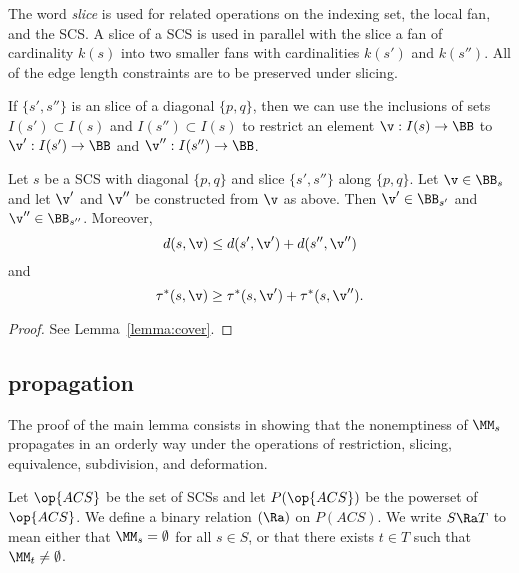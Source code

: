 The word {\it slice} is used for related operations on the indexing
set, the local fan, and the SCS.  A slice of a
SCS is used in parallel with the slice a fan of
cardinality $k(s)$ into two smaller fans with cardinalities $k(s')$ and
$k(s'')$.  
All of the edge length constraints are to be preserved
under slicing.  

If $\{s',s''\}$ is an slice of a diagonal $\{p,q\}$, then we can use
the inclusions of sets $I(s')\subset I(s)$ and $I(s'')\subset I(s)$ to
restrict an element $\v:I(s)\to\BB$ to $\v':I(s')\to \BB$ and
$\v'':I(s'')\to \BB$.  

\begin{lemma}\label{lemma:cover2}
Let $s$ be a SCS with diagonal $\{p,q\}$ and slice
 $\{s',s''\}$ along $\{p,q\}$.
Let $\v\in \BB_s$ and let $\v'$ and $\v''$ be constructed from $\v$ as above.
Then  $\v'\in \BB_{s'}$ and $\v''\in \BB_{s''}$.
Moreover,
\begin{equation}
d(s,\v) \le d(s',\v') + d(s'',\v'')
\end{equation}
and
\begin{equation}
\tau^*(s,\v)\ge \tau^*(s,\v')+\tau^*(s,\v'').
\end{equation}
\end{lemma}

\begin{proof} See Lemma~\ref{lemma:cover}.
\end{proof}

\subsection{propagation}

The proof of the main lemma consists in showing that the nonemptiness
of $\MM_s$ propagates in an orderly way under the operations of
restriction, slicing, equivalence, subdivision, and deformation.

\begin{definition}[$\Ra$] 
Let $\op{ACS}$ be the set of SCSs
and let $P(\op{ACS})$ be the powerset of $\op{ACS}$. 
We define a binary relation $(\Ra)$ on $P(ACS)$.  We write
$S\Ra T$ to mean  either that $\MM_s=\emptyset$ for all $s\in S$,
or that there exists $t\in T$ such that $\MM_t\ne\emptyset$.
\end{definition}

